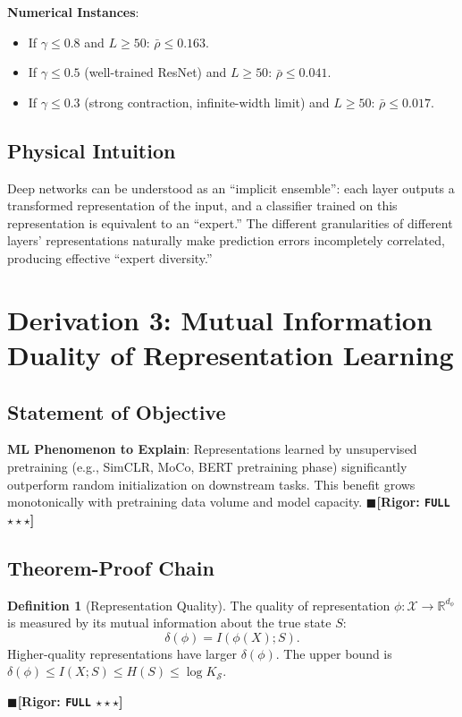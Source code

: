 \documentclass[12pt,a4paper]{article}
\theoremstyle{definition}
\newtheorem{definition}{Definition}[section]
\theoremstyle{remark}
\newcommand{\rigorFull}{$\blacksquare$\;\textbf{[Rigor: \texttt{FULL} $\star\star\star$]}}
\begin{document}
\textbf{Numerical Instances}:
\begin{itemize}
\item If $\gamma \leq 0.8$ and $L \geq 50$: $\bar{\rho} \leq 0.163$.
\item If $\gamma \leq 0.5$ (well-trained ResNet) and $L \geq 50$: $\bar{\rho} \leq 0.041$.
\item If $\gamma \leq 0.3$ (strong contraction, infinite-width limit) and $L \geq 50$: $\bar{\rho} \leq 0.017$.
\end{itemize}

\subsection{Physical Intuition}
Deep networks can be understood as an ``implicit ensemble'': each layer outputs a transformed representation of the input, and a classifier trained on this representation is equivalent to an ``expert.'' The different granularities of different layers' representations naturally make prediction errors incompletely correlated, producing effective ``expert diversity.''

\section{Derivation 3: Mutual Information Duality of Representation Learning}
\label{sec:representation}

\subsection{Statement of Objective}
\textbf{ML Phenomenon to Explain}: Representations learned by unsupervised pretraining (e.g., SimCLR, MoCo, BERT pretraining phase) significantly outperform random initialization on downstream tasks. This benefit grows monotonically with pretraining data volume and model capacity.
\rigorFull

\subsection{Theorem-Proof Chain}

\begin{definition}[Representation Quality]
The quality of representation $\phi: \mathcal{X} \to \mathbb{R}^{d_\phi}$ is measured by its mutual information about the true state $S$:
\begin{equation}
\delta(\phi) = I(\phi(X); S).
\end{equation}
Higher-quality representations have larger $\delta(\phi)$. The upper bound is $\delta(\phi) \leq I(X; S) \leq H(S) \leq \log K_{\mathcal{S}}$.
\end{definition}
\rigorFull
\end{document}
